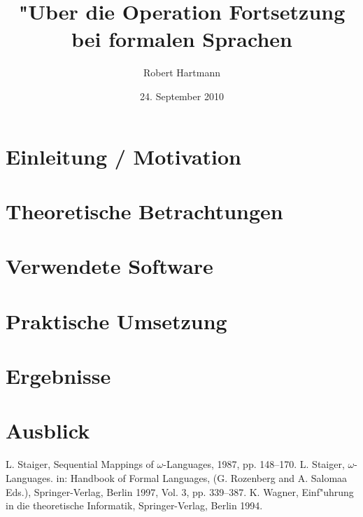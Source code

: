 \documentclass[12pt]{scrreprt}
\author{Robert Hartmann}
\title{"Uber die Operation Fortsetzung bei formalen Sprachen}
\date{24. September 2010}
\theoremstyle{remark}
\begin{document}

%

\pagestyle{plain}
\tableofcontents

\onehalfspacing

\chapter{Einleitung / Motivation}


\chapter{Theoretische Betrachtungen}


\chapter{Verwendete Software}


\chapter{Praktische Umsetzung}


\chapter{Ergebnisse}


\chapter{Ausblick}


\begin{thebibliography}{9}
L. Staiger, Sequential Mappings of $\omega$-Languages, 1987, pp. 148--170.
L. Staiger, $\omega$-Languages. in: Handbook of Formal Languages, (G. Rozenberg and A. Salomaa Eds.), Springer-Verlag, Berlin 1997, Vol. 3, pp. 339--387.
K. Wagner, Einf"uhrung in die theoretische Informatik, Springer-Verlag, Berlin 1994.

\end{thebibliography}



\end{document}
